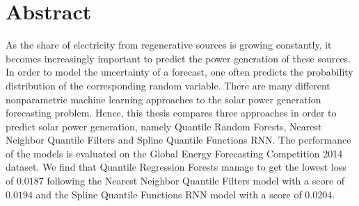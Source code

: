 
\chapter*{Abstract}

\begin{center}
  \begin{minipage}{12cm}
    \begin{sloppypar}
      As the share of electricity from regenerative sources is growing constantly, 
      it becomes increasingly important to predict the power generation of these sources. 
      In order to model the uncertainty of a forecast, one often predicts the probability 
      distribution of the corresponding random variable. There are many different nonparametric machine learning approaches 
      to the solar power generation forecasting problem. Hence, this thesis compares three approaches 
      in order to predict solar power generation, namely Quantile Random Forests, Nearest Neighbor Quantile Filters and 
      Spline Quantile Functions RNN. The performance of the models is evaluated on the Global Energy Forecasting Competition 2014 
      dataset. 
      We find that Quantile Regression Forests manage to get the lowest loss of \(0.0187\) following 
      the Nearest Neighbor Quantile Filters model with a score of \(0.0194\) and the Spline Quantile Functions RNN model with a score of \(0.0204\). 
    \end{sloppypar}
  \end{minipage}
\end{center}